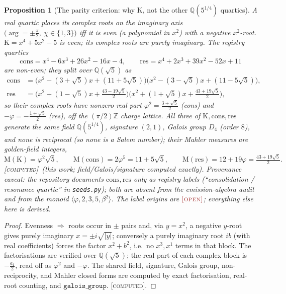\documentclass[11pt]{article}
\theoremstyle{plain}
\newtheorem{proposition}[theorem]{Proposition}
\theoremstyle{definition}
\theoremstyle{remark}
\newcommand{\computed}{\textup{\textcolor{forcedc}{\textsc{[computed]}}}}
\newcommand{\openq}{\textup{\textcolor{openc}{\textsc{[open]}}}}
\newcommand{\Q}{\mathbb{Q}}
\newcommand{\Z}{\mathbb{Z}}
\newcommand{\Mah}{\mathrm{M}}
\newcommand{\abs}[1]{\left\lvert #1 \right\rvert}
\newcommand{\Kf}{\mathrm{K}}
\begin{document}
\begin{proposition}[The parity criterion: why $\Kf$, not the other $\Q(5^{1/4})$ quartics]\label{prop:parity}
A real quartic places its complex roots on the imaginary axis $\bigl(\arg=\pm\tfrac{\pi}{2},\ \chi\in\{1,3\}\bigr)$
iff it is \emph{even} (a polynomial in $x^2$) with a negative $x^2$-root. $\Kf=x^4+5x^2-5$ is even; its complex
roots are purely imaginary. The registry quartics
\[
\mathrm{cons}=x^4-6x^3+26x^2-16x-4,\qquad \mathrm{res}=x^4+2x^3+39x^2-52x+11
\]
are \emph{non-even}; they split over $\Q(\sqrt5)$ as
\begin{align*}
\mathrm{cons}&=\bigl(x^2-(3+\sqrt5)x+(11+5\sqrt5)\bigr)\bigl(x^2-(3-\sqrt5)x+(11-5\sqrt5)\bigr),\\
\mathrm{res} &=\bigl(x^2+(1-\sqrt5)x+\tfrac{43-19\sqrt5}{2}\bigr)\bigl(x^2+(1+\sqrt5)x+\tfrac{43+19\sqrt5}{2}\bigr),
\end{align*}
so their complex roots have nonzero real part $\varphi^2=\tfrac{3+\sqrt5}{2}$ (\textrm{cons}) and
$-\varphi=-\tfrac{1+\sqrt5}{2}$ (\textrm{res}), \emph{off} the $(\pi/2)\Z$ charge lattice. All three of
$\Kf,\mathrm{cons},\mathrm{res}$ generate the same field $\Q(5^{1/4})$, signature $(2,1)$, Galois group $D_4$
(order $8$), and none is reciprocal (so none is a Salem number); their Mahler measures are golden-field integers,
\[
\Mah(\Kf)=\varphi^2\sqrt5,\qquad \Mah(\mathrm{cons})=2\varphi^5=11+5\sqrt5,\qquad
\Mah(\mathrm{res})=12+19\varphi=\tfrac{43+19\sqrt5}{2}.
\]
\computed\ (this work; field/Galois/signature computed exactly). \emph{Provenance caveat:} the repository
documents $\mathrm{cons},\mathrm{res}$ only as registry labels (``consolidation / resonance quartic'' in
\texttt{seeds.py}); both are absent from the emission-algebra audit and from the monoid
$\langle\varphi,2,3,5,\beta^2\rangle$. The label origins are $\openq$; everything else here is derived.
\end{proposition}
\begin{proof}
Evenness $\Rightarrow$ roots occur in $\pm$ pairs and, via $y=x^2$, a negative $y$-root gives purely imaginary
$x=\pm i\sqrt{\abs y}$; conversely a purely imaginary root $ib$ (with real coefficients) forces the factor
$x^2+b^2$, i.e.\ no $x^3,x^1$ terms in that block. The factorisations are verified over $\Q(\sqrt5)$; the
real part of each complex block is $-\tfrac{a_1}{2}$, read off as $\varphi^2$ and $-\varphi$. The shared field,
signature, Galois group, non-reciprocity, and Mahler closed forms are computed by exact factorisation, real-root
counting, and $\texttt{galois\_group}$. \computed.
\end{proof}
\end{document}
